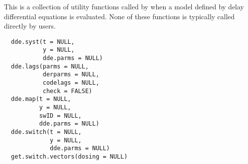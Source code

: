 %
\begin{Description}\relax
This is a collection of utility functions called by  when 
a model defined by delay differential equations is evaluated. None of these 
functions is typically called directly by users.
\end{Description}
%
\begin{Usage}
\begin{verbatim}
  dde.syst(t = NULL,
           y = NULL,
           dde.parms = NULL)
  dde.lags(parms = NULL,
           derparms = NULL,
           codelags = NULL,
           check = FALSE)
  dde.map(t = NULL,
          y = NULL,
          swID = NULL,
          dde.parms = NULL)
  dde.switch(t = NULL,
             y = NULL,
             dde.parms = NULL)
  get.switch.vectors(dosing = NULL)
\end{verbatim}
\end{Usage}
%
